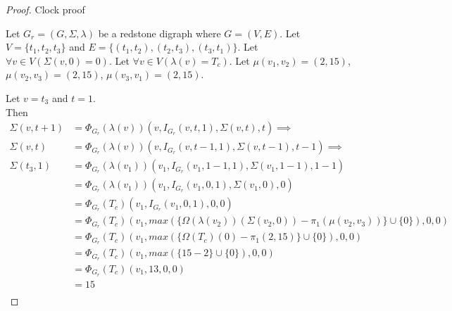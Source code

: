 \documentclass{article}
\begin{document}
\begin{proof} Clock proof
	
	\begin{outline}
		\1 Let \(G_{r} = (G, \Sigma, \lambda)\) be a redstone digraph where \(G = (V, E)\). 
		\1 Let \(V = \{t_{1}, t_{2}, t_{3}\}\) and \(E = \{(t_{1}, t_{2}), (t_{2}, t_{3}), (t_{3}, t_{1})\}\).
		\1 Let \(\forall v \in V(\Sigma(v, 0) = 0)\).
		\1 Let \(\forall v \in V(\lambda(v) = T_{c})\).
		\1 Let \(\mu(v_{1}, v_{2}) = (2, 15)\), \(\mu(v_{2}, v_{3}) = (2, 15)\), \(\mu(v_{3}, v_{1}) = (2, 15)\).
	\end{outline}

	Let \(v = t_{3}\) and \(t = 1\). \\
	Then
	\begin{align*}
		\Sigma(v, t + 1) &= \Phi_{G_{r}}(\lambda(v))(v, I_{G_{r}}(v, t, 1), \Sigma(v, t), t) \implies \\
		\Sigma(v, t) &= \Phi_{G_{r}}(\lambda(v))(v, I_{G_{r}}(v, t - 1, 1), \Sigma(v, t - 1), t - 1) \implies \\
		\Sigma(t_{3}, 1) &= \Phi_{G_{r}}(\lambda(v_{1}))(v_{1}, I_{G_{r}}(v_{1}, 1 - 1, 1), \Sigma(v_{1}, 1 - 1), 1 - 1)\\
						 &= \Phi_{G_{r}}(\lambda(v_{1}))(v_{1}, I_{G_{r}}(v_{1}, 0, 1), \Sigma(v_{1}, 0), 0) \\
						 &= \Phi_{G_{r}}(T_{c})(v_{1}, I_{G_{r}}(v_{1}, 0, 1), 0, 0) \\
						 &= \Phi_{G_{r}}(T_{c})(v_{1}, max(\{\Omega(\lambda(v_{2}))(\Sigma(v_{2}, 0)) - \pi_{1}(\mu(v_{2}, v_{3}))\} \cup \{0\}), 0, 0) \\
						 &= \Phi_{G_{r}}(T_{c})(v_{1}, max(\{\Omega(T_{c})(0) - \pi_{1}(2, 15)\} \cup \{0\}), 0, 0) \\
						 &= \Phi_{G_{r}}(T_{c})(v_{1}, max(\{15 - 2\} \cup \{0\}), 0, 0) \\
						 &= \Phi_{G_{r}}(T_{c})(v_{1}, 13, 0, 0) \\
						 &= 15 \\
	\end{align*}


\end{proof}
\end{document}
